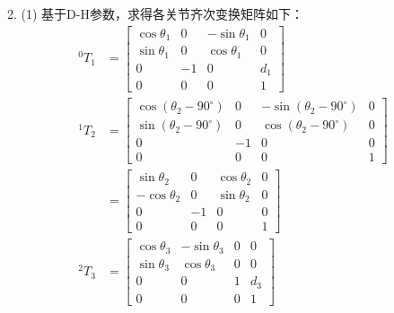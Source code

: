 \documentclass[UTF8, 13pt]{ctexart}
\begin{document}
2.
(1)
基于D-H参数，求得各关节齐次变换矩阵如下：
\[
\begin{aligned}
    {}^0 T_1 &= \begin{bmatrix}
                    \cos\theta_1 & 0 & -\sin\theta_1 & 0 \\
                    \sin\theta_1 & 0 & \cos\theta_1 & 0 \\
                    0 & -1 & 0 & d_1 \\
                    0 & 0 & 0 & 1
                \end{bmatrix} \\
    {}^1 T_2 &= \begin{bmatrix}
                    \cos(\theta_2 - 90^\circ) & 0 & -\sin(\theta_2 - 90^\circ) & 0 \\
                    \sin(\theta_2 - 90^\circ) & 0 & \cos(\theta_2 - 90^\circ) & 0 \\
                    0 & -1 & 0 & 0 \\
                    0 & 0 & 0 & 1
                \end{bmatrix} \\
            &= \begin{bmatrix}
                    \sin\theta_2 & 0 & \cos\theta_2 & 0 \\
                    -\cos\theta_2 & 0 & \sin\theta_2 & 0 \\
                    0 & -1 & 0 & 0 \\
                    0 & 0 & 0 & 1
                \end{bmatrix} \\
    {}^2 T_3 &= \begin{bmatrix}
                    \cos\theta_3 & -\sin\theta_3 & 0 & 0 \\
                    \sin\theta_3 & \cos\theta_3 & 0 & 0 \\
                    0 & 0 & 1 & d_3 \\
                    0 & 0 & 0 & 1
                \end{bmatrix} \\
\end{aligned}
\]
\end{document}
